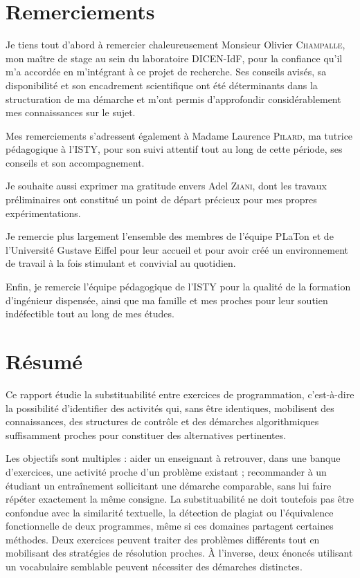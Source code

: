 \documentclass[12pt,a4paper,oneside]{report}
\begin{document}


\chapter*{Remerciements}
Je tiens tout d'abord à remercier chaleureusement Monsieur Olivier \textsc{Champalle}, mon maître de stage au sein du laboratoire DICEN-IdF, pour la confiance qu'il m'a accordée en m'intégrant à ce projet de recherche. Ses conseils avisés, sa disponibilité et son encadrement scientifique ont été déterminants dans la structuration de ma démarche et m'ont permis d'approfondir considérablement mes connaissances sur le sujet.

Mes remerciements s'adressent également à Madame Laurence \textsc{Pilard}, ma tutrice pédagogique à l'ISTY, pour son suivi attentif tout au long de cette période, ses conseils et son accompagnement.

Je souhaite aussi exprimer ma gratitude envers Adel \textsc{Ziani}, dont les travaux préliminaires ont constitué un point de départ précieux pour mes propres expérimentations. 

Je remercie plus largement l'ensemble des membres de l'équipe PLaTon et de l'Université Gustave Eiffel pour leur accueil et pour avoir créé un environnement de travail à la fois stimulant et convivial au quotidien.

Enfin, je remercie l'équipe pédagogique de l'ISTY pour la qualité de la formation d'ingénieur dispensée, ainsi que ma famille et mes proches pour leur soutien indéfectible tout au long de mes études.

\chapter*{Résumé}

Ce rapport étudie la substituabilité entre exercices de
programmation, c'est-à-dire la possibilité d'identifier des activités qui,
sans être identiques, mobilisent des connaissances, des structures de
contrôle et des démarches algorithmiques suffisamment proches pour
constituer des alternatives pertinentes.

Les objectifs sont multiples : aider un enseignant à retrouver, dans une banque
d'exercices, une activité proche d'un problème existant ; recommander à
un étudiant un entraînement sollicitant une démarche comparable, sans lui
faire répéter exactement la même consigne. La substituabilité ne doit
toutefois pas être confondue avec la similarité textuelle, la détection de
plagiat ou l'équivalence fonctionnelle de deux programmes, même si ces
domaines partagent certaines méthodes. Deux exercices
peuvent traiter des problèmes différents tout en mobilisant des stratégies
de résolution proches. À l'inverse, deux énoncés utilisant un vocabulaire
semblable peuvent nécessiter des démarches distinctes.
\end{document}
